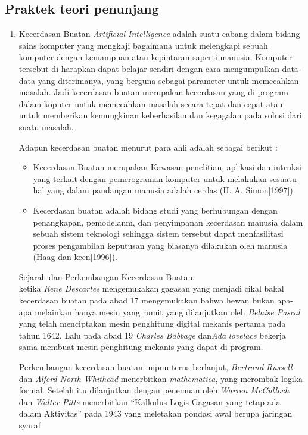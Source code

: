 \subsection{Praktek teori penunjang}
\begin{enumerate}
\item
Kecerdasan Buatan \textit{Artificial Intelligence} adalah suatu cabang dalam bidang sains komputer yang mengkaji bagaimana untuk melengkapi sebuah komputer dengan kemampuan atau kepintaran saperti manusia. Komputer tersebut di harapkan dapat belajar sendiri dengan cara mengumpulkan data-data yang diterimanya, yang berguna sebagai parameter untuk memecahkan masalah. Jadi kecerdasan buatan merupakan kecerdasan yang di program dalam koputer untuk memecahkan masalah secara tepat dan cepat atau untuk memberikan kemungkinan keberhasilan dan kegagalan pada solusi dari suatu masalah.\par
Adapun kecerdasan buatan menurut para ahli adalah sebagai berikut :
\begin{itemize}
\item 
Kecerdasan Buatan merupakan Kawasan penelitian, aplikasi dan intruksi yang terkait dengan pemerograman komputer untuk melakukan sesuatu hal yang dalam pandangan manusia adalah cerdas (H. A. Simon[1997]).
\item 
Kecerdasan buatan adalah bidang studi yang berhubungan dengan penangkapan, pemodelanm, dan penyimpanan kecerdasan manusia dalam sebuah sistem teknologi sehingga sistem tersebut dapat menfasilitasi proses pengambilan keputusan yang biasanya dilakukan oleh manusia (Haag dan keen[1996]).
\end{itemize}
Sejarah dan Perkembangan Kecerdasan Buatan.\\
ketika \textit{Rene Descartes} mengemukakan gagasan yang menjadi cikal bakal kecerdasan buatan pada abad 17 mengemukakan bahwa hewan bukan apa-apa melainkan hanya mesin yang rumit yang dilanjutkan oleh \textit{Belaise Pascal} yang telah menciptakan mesin penghitung digital mekanis pertama pada tahun 1642. Lalu pada abad 19 \textit{Charles Babbage} dan\textit{Ada lovelace}  bekerja sama membuat mesin penghitung mekanis yang dapat di program.\par
Perkembangan kecerdasan buatan inipun terus berlanjut,\textit{ Bertrand Russell} dan\textit{ Alferd North Whithead} menerbitkan \textit{mathematica}, yang merombak logika formal. Setelah itu dilanjutkan dengan penemuan oleh \textit{ Warren McCulloch} dan \textit{ Walter Pitts} menerbitkan “Kalkulus Logis Gagasan yang tetap ada dalam Aktivitas” pada 1943 yang meletakan pondasi awal berupa jaringan syaraf 

\end{enumerate}
